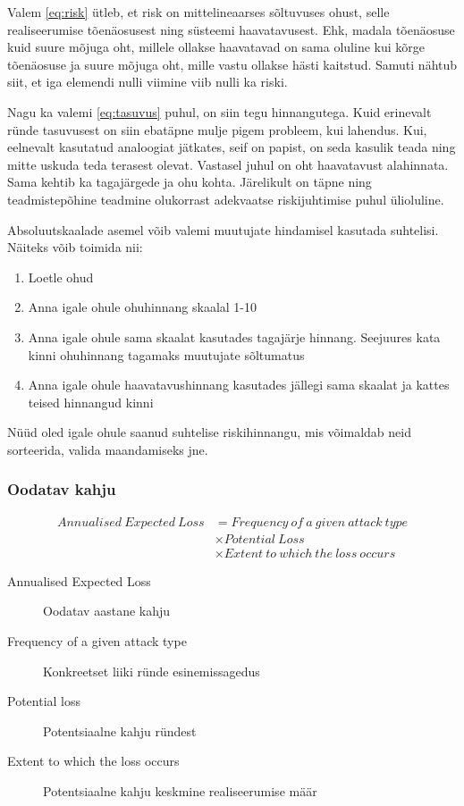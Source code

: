 \documentclass{article}
\begin{document}
Valem \ref{eq:risk} ütleb, et risk on mittelineaarses sõltuvuses ohust, selle realiseerumise tõenäosusest ning süsteemi haavatavusest. Ehk, madala tõenäosuse kuid suure mõjuga oht, millele ollakse haavatavad on sama oluline kui kõrge tõenäosuse ja suure mõjuga oht, mille vastu ollakse hästi kaitstud. Samuti nähtub siit, et iga elemendi nulli viimine viib nulli ka riski. 

Nagu ka valemi \ref{eq:tasuvus} puhul, on siin tegu hinnangutega. Kuid erinevalt ründe tasuvusest on siin ebatäpne mulje pigem probleem, kui lahendus. Kui, eelnevalt kasutatud analoogiat jätkates, seif on papist, on seda kasulik teada ning mitte uskuda teda terasest olevat. Vastasel juhul on oht haavatavust alahinnata. Sama kehtib ka tagajärgede ja ohu kohta. Järelikult on täpne ning teadmistepõhine teadmine olukorrast adekvaatse riskijuhtimise puhul ülioluline.

Absoluutskaalade asemel võib valemi muutujate hindamisel kasutada suhtelisi. Näiteks võib toimida nii:

\begin{enumerate}
	\item Loetle ohud
	\item Anna igale ohule ohuhinnang skaalal 1-10
	\item Anna igale ohule sama skaalat kasutades tagajärje hinnang. Seejuures kata kinni ohuhinnang tagamaks muutujate sõltumatus
	\item Anna igale ohule haavatavushinnang kasutades jällegi sama skaalat ja kattes teised hinnangud kinni
\end{enumerate}

Nüüd oled igale ohule saanud suhtelise riskihinnangu, mis võimaldab neid sorteerida, valida maandamiseks jne.  

\subsubsection{Oodatav kahju} 

	\begin{align}
		Annualised\ Expected\ Loss &= Frequency\ of\ a\ given\ attack\ type \label{eq:loss}\\
		&\times Potential\ Loss \nonumber \\
		&\times Extent\ to\ which\ the\ loss\ occurs \nonumber
	\end{align}

\begin{description}
	\item[Annualised Expected Loss] Oodatav aastane kahju
	\item[Frequency of a given attack type] Konkreetset liiki ründe esinemissagedus
	\item[Potential loss] Potentsiaalne kahju ründest
	\item[Extent to which the loss occurs] Potentsiaalne kahju keskmine realiseerumise määr
\end{description}
\end{document}
